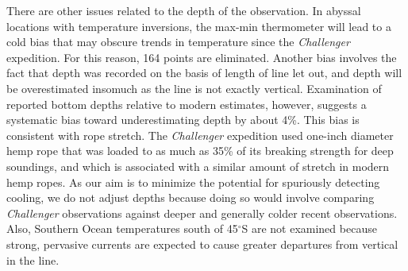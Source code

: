 \documentclass[12pt]{article}
\begin{document}

There are other issues related to the depth of the observation.  In
abyssal locations with temperature inversions, the max-min thermometer
will lead to a cold bias that may obscure trends in temperature since
the {\it Challenger} expedition. For this reason, 164 points are eliminated. Another bias involves the fact that
depth was recorded on the basis of length of line let out, and depth
will be overestimated insomuch as the line is not exactly vertical.
Examination of reported bottom depths relative to modern estimates,
however, suggests a systematic bias toward underestimating depth by
about 4\%. This bias is consistent with rope stretch.  The {\it
  Challenger} expedition used one-inch diameter hemp rope that was
loaded to as much as 35\% of its breaking strength for deep soundings,
and which is associated with a similar amount of stretch in modern
hemp ropes\cite{McKenna-Hearle-2004:Handbook}.  As our aim is to
minimize the potential for spuriously detecting cooling, we do not
adjust depths because doing so would involve comparing {\it
  Challenger} observations against deeper and generally colder recent
observations.  Also, Southern Ocean temperatures south of 45$^{\circ}$S are not examined
because strong, pervasive currents are expected to cause greater
departures from vertical in the line\cite{Roemmich-Gould-2012:135}.
\end{document}
